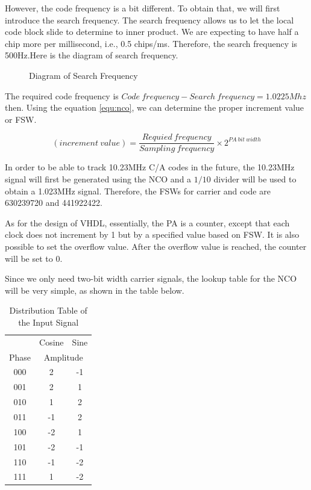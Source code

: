 However, the code frequency is a bit different. To obtain that, we will first introduce the search frequency. The search frequency allows us to let the local code block slide to determine to inner product. We are expecting to have half a chip more per millisecond, i.e., 0.5 chips/ms. Therefore, the search frequency is 500Hz.Here is the diagram of search frequency.

\begin{figure}[!htbp]
    \centering
    
    \caption{Diagram of Search Frequency}
    \label{fig:search_frequency}
\end{figure}

The required code frequency is $Code\  frequency-Search\ frequency = 1.0225Mhz$ then. Using the equation \ref{equ:nco}, we can determine the proper increment value or FSW.

\begin{equation}
    (increment\ value) = \frac{Requied\ frequency}{Sampling\ frequency} \times 2^{PA\ bit\ width}
\end{equation}

In order to be able to track 10.23MHz C/A codes in the future, the 10.23MHz signal will first be generated using the NCO and a $1/10$ divider will be used to obtain a 1.023MHz signal. Therefore, the FSWs for carrier and code are \num{630239720} and \num{441922422}.

As for the design of VHDL, essentially, the PA is a counter, except that each clock does not increment by 1 but by a specified value based on FSW. It is also possible to set the overflow value. After the overflow value is reached, the counter will be set to 0.

Since we only need two-bit width carrier signals, the lookup table for the NCO will be very simple, as shown in the table below.
\begin{table}[]
\caption{Distribution Table of the Input Signal}
\label{tab:dis_sig}
\begin{tabular}{ccc}
 & Cosine & Sine \\
Phase & \multicolumn{2}{c}{Amplitude} \\
000 & 2 & -1 \\
001 & 2 & 1 \\
010 & 1 & 2 \\
011 & -1 & 2 \\
100 & -2 & 1 \\
101 & -2 & -1 \\
110 & -1 & -2 \\
111 & 1 & -2
\end{tabular}
\end{table}
